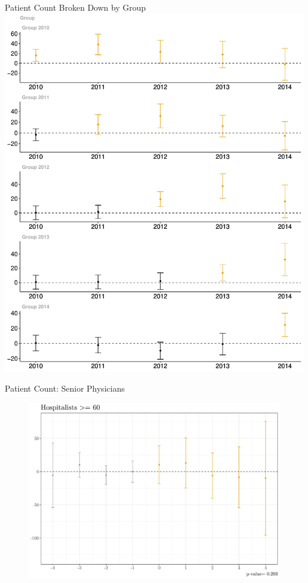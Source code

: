 \documentclass[10pt]{beamer}
\begin{document}
\begin{frame}{Patient Count Broken Down by Group}
\centering
    \includegraphics[scale=.25]{Objects/patient_group.pdf}
\end{frame}

\begin{frame}{Patient Count: Senior Physicians}
\begin{figure}[ht]
    \centering
    \includegraphics[scale=.4]{Objects/Presentation_patients_old.pdf}
\end{figure}
\end{frame}
\end{document}
